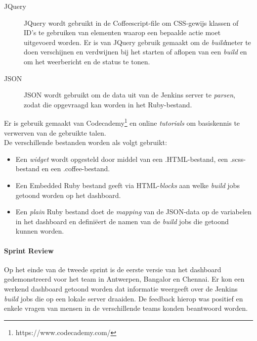 \documentclass[10pt,a4paper]{article}
\begin{document}
\begin{description}
\item[JQuery] JQuery wordt gebruikt in de Coffeescript-file om CSS-gewijs klassen of ID's te gebruiken van elementen waarop een bepaalde actie moet uitgevoerd worden. Er is van JQuery gebruik gemaakt om de \textit{build}meter te doen verschijnen en verdwijnen bij het starten of aflopen van een \textit{build} en om het weerbericht en de status te tonen.
\item[JSON] JSON wordt gebruikt om de data uit van de Jenkins server te \textit{parsen}, zodat die opgevraagd kan worden in het Ruby-bestand.
\end{description}
Er is gebruik gemaakt van Codecademy\footnote{https://www.codecademy.com/} en online \textit{tutorials} om basiskennis te verwerven van de gebruikte talen.\\

De verschillende bestanden worden als volgt gebruikt:
\begin{itemize}
\item Een \textit{widget} wordt opgesteld door middel van een .HTML-bestand, een .scss-bestand en een .coffee-bestand.
\item Een Embedded Ruby bestand geeft via HTML-\textit{blocks} aan welke \textit{build} jobs getoond worden op het dashboard.
\item Een \textit{plain} Ruby bestand doet de \textit{mapping} van de JSON-data op de variabelen in het dashboard en defini\"eert de namen van de \textit{build} jobs die getoond kunnen worden.
\end{itemize}
\paragraph{Sprint Review} Op het einde van de tweede sprint is de eerste versie van het dashboard gedemonstreerd voor het team in Antwerpen, Bangalor en Chennai. Er kon een werkend dashboard getoond worden dat informatie weergeeft over de Jenkins \textit{build} jobs die op een lokale server draaiden. De feedback hierop was positief en enkele vragen van mensen in de verschillende teams konden beantwoord worden. 
\end{document}
